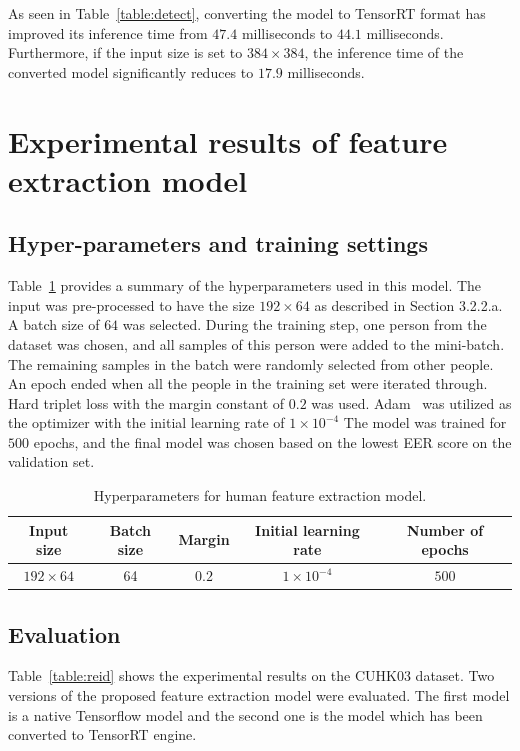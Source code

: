 \documentclass[../main.tex]{subfiles}
\begin{document}
As seen in Table~\ref{table:detect}, converting the model to TensorRT format has improved its inference time from $47.4$ milliseconds to $44.1$ milliseconds. Furthermore, if the input size is set to $384\times384$, the inference time of the converted model significantly reduces to $17.9$ milliseconds.

\section{Experimental results of feature extraction model}
\label{exp:feature}

\subsection{Hyper-parameters and training settings}
\label{subsec:hyper_train}
Table~\ref{table:hyperparam} provides a summary of the hyperparameters used in this model. The input was pre-processed to have the size $192\times64$ as described in Section 3.2.2.a. A batch size of $64$ was selected. During the training step, one person from the dataset was chosen, and all samples of this person were added to the mini-batch. The remaining samples in the batch were randomly selected from other people. An epoch ended when all the people in the training set were iterated through. Hard triplet loss with the margin constant of $0.2$ was used. Adam~\cite{kingma2014adam} was utilized as the optimizer with the initial learning rate of $1\times10^{-4}$ The model was trained for $500$ epochs, and the final model was chosen based on the lowest EER score on the validation set.

\begin{table}[h!]
\centering
\begin{tabular}{||c | c | c | c | c ||} 
\hline 
Input size & Batch size & Margin & Initial learning rate & Number of epochs \\
\hline
$192\times64$ & 64 & $0.2$ & $1\times10^{-4}$ & $500$ \\
\hline
\end{tabular}
\caption{Hyperparameters for human feature extraction model.}
\label{table:hyperparam}
\end{table}

\subsection{Evaluation}
Table~\ref{table:reid} shows the experimental results on the CUHK03 dataset. Two versions of the proposed feature extraction model were evaluated. The first model is a native Tensorflow model and the second one is the model which has been converted to TensorRT engine.
\end{document}
